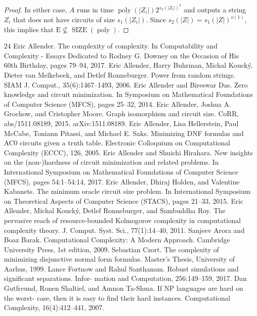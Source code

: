 \documentclass[10pt,a4paper]{article}
\newcommand{\SIZE}{\operatorname{SIZE}}
\newcommand{\poly}{\operatorname{poly}}
\begin{document}
\begin{proof}
In either case, $A$ runs in time $\poly(|Z_i|)2^{s_2(|Z_i|)^3}$ and outputs a string $Z_i$ that does not have circuits of size $s_1(|Z_i|)$. Since $s_2(|Z|)=s_1(|Z|)^{o(1)}$, this implies that $\mathrm E\not\subseteq\SIZE(\poly)$.
\end{proof}

\begin{thebibliography}{24}
Eric Allender. The complexity of complexity. In Computability and Complexity - Essays Dedicated to Rodney G. Downey on the Occasion of His 60th Birthday, pages 79–94, 2017.
Eric Allender, Harry Buhrman, Michal Koucký, Dieter van Melkebeek, and Detlef Ronneburger. Power from random strings. SIAM J. Comput., 35(6):1467–1493, 2006.
Eric Allender and Bireswar Das. Zero knowledge and circuit minimization. In Symposium on Mathematical Foundations of Computer Science (MFCS), pages 25–32, 2014.
Eric Allender, Joshua A. Grochow, and Cristopher Moore. Graph isomorphism and circuit size. CoRR, abs/1511.08189, 2015. arXiv:1511.08189.
Eric Allender, Lisa Hellerstein, Paul McCabe, Toniann Pitassi, and Michael E. Saks. Minimizing DNF formulas and AC0 circuits given a truth table. Electronic Colloquium on Computational Complexity (ECCC), 126, 2005.
Eric Allender and Shuichi Hirahara. New insights on the (non-)hardness of circuit minimization and related problems. In International Symposium on Mathematical Foundations of Computer Science (MFCS), pages 54:1–54:14, 2017.
Eric Allender, Dhiraj Holden, and Valentine Kabanets. The minimum oracle circuit size problem. In International Symposium on Theoretical Aspects of Computer Science (STACS), pages 21–33, 2015.
Eric Allender, Michal Koucký, Detlef Ronneburger, and Sambuddha Roy. The pervasive reach of resource-bounded Kolmogorov complexity in computational complexity theory. J. Comput. Syst. Sci., 77(1):14–40, 2011.
Sanjeev Arora and Boaz Barak. Computational Complexity: A Modern Approach. Cambridge University Press, 1st edition, 2009.
Sebastian Czort. The complexity of minimizing disjunctive normal form formulas. Master’s Thesis, University of Aarhus, 1999.
Lance Fortnow and Rahul Santhanam. Robust simulations and significant separations. Infor- mation and Computation, 256:149–159, 2017.
Dan Gutfreund, Ronen Shaltiel, and Amnon Ta-Shma. If NP languages are hard on the worst- case, then it is easy to find their hard instances. Computational Complexity, 16(4):412–441, 2007.

\end{thebibliography}
\end{document}
